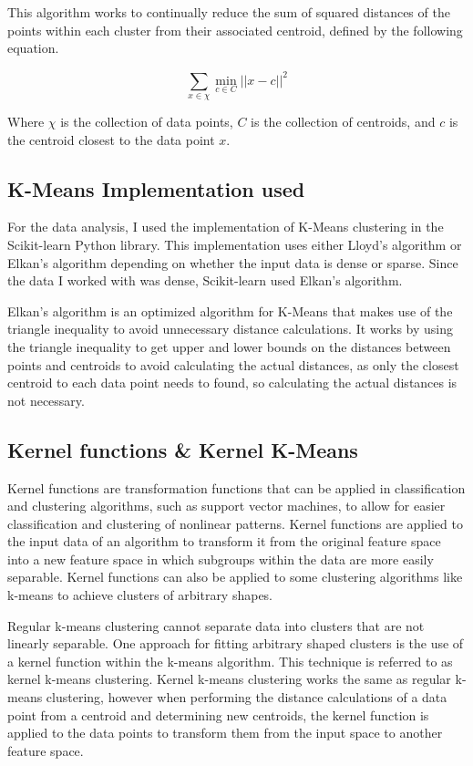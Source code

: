 \documentclass[]{article}
\begin{document}
This algorithm works to continually reduce the sum of squared distances of the points within each cluster from their associated centroid, defined by the following equation. \cite{arthur_2007}

$$
\sum_{x \in \chi}^{}\min_{c \in C} || x - c ||^2
$$

Where $\chi$ is the collection of data points, $C$ is the collection of centroids, and $c$ is the centroid closest to the data point $x$.

\subsection{K-Means Implementation used}
For the data analysis, I used the implementation of K-Means clustering in the Scikit-learn Python library. \cite{pedregosa_2011} This implementation uses either Lloyd’s algorithm or Elkan’s algorithm depending on whether the input data is dense or sparse. \cite{scikit_learn_kmeans} Since the data I worked with was dense, Scikit-learn used Elkan’s algorithm.

Elkan’s algorithm is an optimized algorithm for K-Means that makes use of the triangle inequality to avoid unnecessary distance calculations. It works by using the triangle inequality to get upper and lower bounds on the distances between points and centroids to avoid calculating the actual distances, as only the closest centroid to each data point needs to found, so calculating the actual distances is not necessary. \cite{elkan_2003}

\subsection{Kernel functions \& Kernel K-Means}

Kernel functions are transformation functions that can be applied in classification and clustering algorithms, such as support vector machines, to allow for easier classification and clustering of nonlinear patterns. Kernel functions are applied to the input data of an algorithm to transform it from the original feature space into a new feature space in which subgroups within the data are more easily separable. \cite{amari_1999} Kernel functions can also be applied to some clustering algorithms like k-means to achieve clusters of arbitrary shapes. \cite{scholkopf_1998, jain_2010}

Regular k-means clustering cannot separate data into clusters that are not linearly separable. One approach for fitting arbitrary shaped clusters is the use of a kernel function within the k-means algorithm. This technique is referred to as kernel k-means clustering. Kernel k-means clustering works the same as regular k-means clustering, however when performing the distance calculations of a data point from a centroid and determining new centroids, the kernel function is applied to the data points to transform them from the input space to another feature space. \cite{dhillon_2004}
\end{document}
